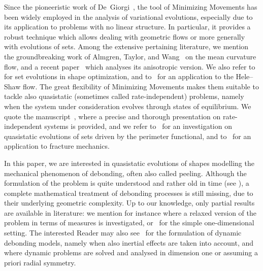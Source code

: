 \documentclass[a4paper,11pt,reqno]{amsart}
\numberwithin{equation}{section}
\theoremstyle{definition}
\theoremstyle{remark}
\begin{document}
Since the pioneeristic work of De~Giorgi~\cite{DeGiorgi}, the tool of Minimizing Movements has been widely employed in the analysis of variational evolutions, especially due to its application to problems with no linear structure.
In particular, it provides a robust technique which allows dealing with geometric flows or more generally with evolutions of sets.
Among the extensive pertaining literature, we mention the groundbreaking work of Almgren, Taylor, and Wang~\cite{ATW93} on the mean curvature flow, and a recent paper~\cite{DGChambolleMorini} which analyses its anisotropic version.
We also refer to~\cite{BucButtStef,CardLey} for set evolutions in shape optimization, and to~\cite{SciannaTilli} for an application to the Hele--Shaw flow.
The great flexibility of Minimizing Movements makes them suitable to tackle also quasistatic (sometimes called rate-independent) problems, namely when the system under consideration evolves through states of equilibrium.
We quote the manuscript~\cite{MielRoubbook}, where a precise and thorough presentation on rate-independent systems is provided, and we refer to~\cite{ChambolleNovaga, RossStefThom} for an investigation on quasistatic evolutions of sets driven by the perimeter functional, and to~\cite{BourdinFrancMar,DalMasoToader} for an application to fracture mechanics.

In this paper, we are interested in quasistatic evolutions of shapes modelling the mechanical phenomenon of debonding, often also called peeling.
Although the formulation of the problem is quite understood and rather old in time (see \cite{BurridgeKeller,Hellan}), a complete mathematical treatment of debonding processes is still missing, due to their underlying geometric complexity.
Up to our knowledge, only partial results are available in literature: we mention for instance \cite{BUCUR2008} where a relaxed version of the problem in terms of measures is investigated, or~\cite{RivQuas} for the simple one-dimensional setting.
The interested Reader may also see~\cite{LMRSMovingdomains} for the formulation of dynamic debonding models, namely when also inertial effects are taken into account, and~\cite{DMLN,LMS, RivContDep, RivNar} where dynamic problems are solved and analysed in dimension one or assuming a priori radial symmetry.
\end{document}
